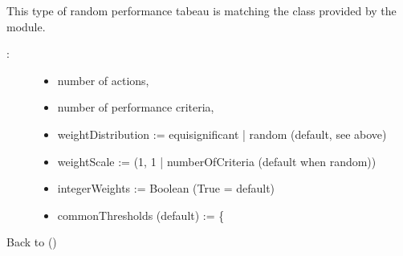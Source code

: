 \documentclass[a4paper,10pt,english]{sphinxhowto}
\begin{document}
This type of random performance tabeau is matching the  class provided by the  module.
\begin{description}
\item[{:}] \leavevmode\begin{itemize}
\item {} 
number of actions,

\item {} 
number of performance criteria,

\item {} 
weightDistribution := equisignificant | random (default, see  above)

\item {} 
weightScale := (1, 1 | numberOfCriteria (default when random))

\item {} 
integerWeights := Boolean (True = default)

\item {} 
commonThresholds (default) := \{
\begin{quote}

\end{quote}

\end{itemize}

\end{description}

Back to {\hyperref[\detokenize{tutorial:tutorial-label}]{}} ()
\end{document}
